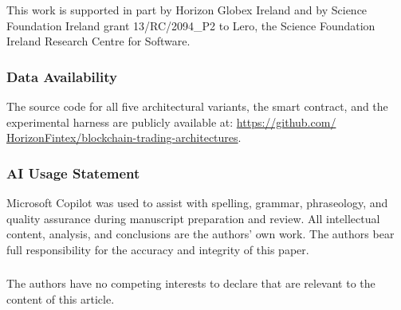 \documentclass[runningheads]{llncs}
\begin{document}










\begin{credits}
\subsubsection{\ackname}
This work is supported in part by Horizon Globex Ireland and by Science Foundation Ireland grant 13/RC/2094\_P2 to Lero, the Science Foundation Ireland Research Centre for Software.

\subsubsection{Data Availability}
The source code for all five architectural variants, the smart contract, and the experimental harness are publicly available at: \url{https://github.com/} \url{HorizonFintex/blockchain-trading-architectures}.

\subsubsection{AI Usage Statement}
Microsoft Copilot was used to assist with spelling, grammar, phraseology, and quality assurance during manuscript preparation and review. All intellectual content, analysis, and conclusions are the authors' own work. The authors bear full responsibility for the accuracy and integrity of this paper.

\subsubsection{\discintname}
The authors have no competing interests to declare that are relevant to the content of this article.
\end{credits}
%
%


\end{document}
